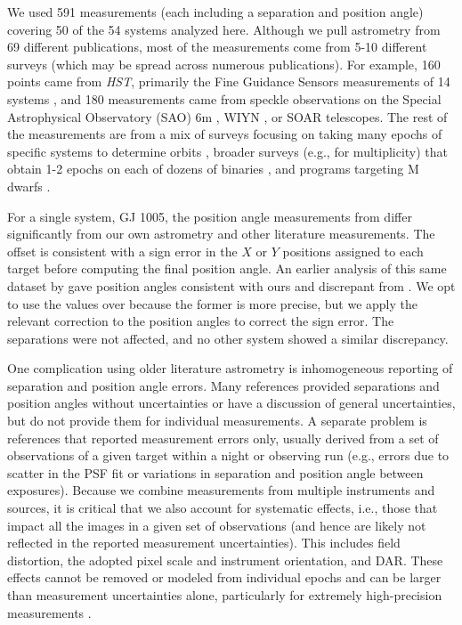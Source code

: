 \documentclass[twocolumn]{aastex62}
\begin{document}
We used 591 measurements (each including a separation and position angle) covering 50 of the 54 systems analyzed here. Although we pull astrometry from 69 different publications, most of the measurements come from 5-10 different surveys (which may be spread across numerous publications). For example, 160 points came from {\it HST}, primarily the Fine Guidance Sensors measurements of 14 systems \citep[e.g.,][]{Benedict2016}, and 180 measurements came from speckle observations on the Special Astrophysical Observatory (SAO) 6m \citep[e.g.,][]{Bag2002}, WIYN \citep[e.g.,][]{Hor2017}, or SOAR \citep[e.g.,][]{Tok2017} telescopes. The rest of the measurements are from a mix of surveys focusing on taking many epochs of specific systems to determine orbits \citep[e.g.,][]{Koh2012}, broader surveys (e.g., for multiplicity) that obtain 1-2 epochs on each of dozens of binaries \citep[e.g.,][]{Jnn2012}, and programs targeting M dwarfs \citep[e.g.,][]{Mason2018}.

For a single system, GJ 1005, the position angle measurements from \citet{Benedict2016} differ significantly from our own astrometry and other literature measurements. The offset is consistent with a sign error in the $X$ or $Y$ positions assigned to each target before computing the final position angle. An earlier analysis of this same dataset by \citet{1998AJ....116.1440H} gave position angles consistent with ours and discrepant from \citet{Benedict2016}. We opt to use the \citet{Benedict2016} values over \citet{1998AJ....116.1440H} because the former is more precise, but we apply the relevant correction to the \citet{Benedict2016} position angles to correct the sign error. The separations were not affected, and no other system showed a similar discrepancy. 

One complication using older literature astrometry is inhomogeneous reporting of separation and position angle errors. Many references provided separations and position angles without uncertainties or have a discussion of general uncertainties, but do not provide them for individual measurements. A separate problem is references that reported measurement errors only, usually derived from a set of observations of a given target within a night or observing run (e.g., errors due to scatter in the PSF fit or variations in separation and position angle between exposures). Because we combine measurements from multiple instruments and sources, it is critical that we also account for systematic effects, i.e., those that impact all the images in a given set of observations (and hence are likely not reflected in the reported measurement uncertainties). This includes field distortion, the adopted pixel scale and instrument orientation, and DAR. These effects cannot be removed or modeled from individual epochs and can be larger than measurement uncertainties alone, particularly for extremely high-precision measurements \citep[e.g.,][]{2009ApJ...690.1463L}.
\end{document}
